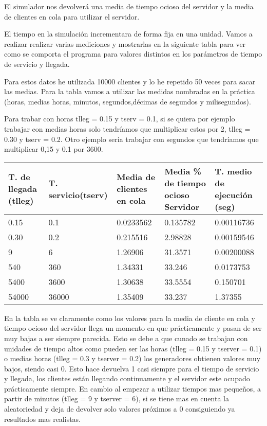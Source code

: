 \documentclass[]{article}
\begin{document}
El simulador nos devolverá una media de tiempo ocioso del servidor y la media de clientes en cola para utilizar el servidor. 
\newline

El tiempo en la simulación incrementara de forma fija en una unidad.
Vamos a realizar realizar varias mediciones y mostrarlas en la siguiente tabla para ver como se comporta el programa para valores distintos en los parámetros de tiempo de servicio y llegada. 
\newline

Para estos datos he utilizada 10000 clientes y lo he repetido 50 veces para sacar las medias.
Para la tabla vamos a utilizar las medidas nombradas en la práctica (horas, medias horas, minutos, segundos,décimas de segundos y milisegundos).
\newpage

Para trabar con horas tlleg = 0.15 y tserv = 0.1, si se quiera por ejemplo trabajar con medias horas solo tendríamos que multiplicar estos por 2, tlleg = 0.30 y tserv = 0.2. Otro ejemplo seria trabajar con segundos que tendríamos que multiplicar 0,15 y 0.1 por 3600.

\begin{table}[H]
	\begin{center}
		\begin{tabularx}{0.9\textwidth}{|X|X|X|X|X|}
			\hline
			\textbf{T. de llegada (tlleg)} & \textbf{T. servicio(tserv)}&\textbf{Media de clientes en cola} & \textbf{Media \% de tiempo ocioso Servidor} & \textbf{T. medio de ejecución (seg)} \\
			\hline \hline
			  0.15 & 0.1 & 0.0233562 & 0.135782 &0.00116736\\ \hline
			  0.30 & 0.2 & 0.215516 & 2.98828 &0.00159546 \\ \hline
			  9 & 6& 1.26906 &31.3571  &0.00200088\\ \hline
			  540 & 360 & 1.34331 & 33.246 &0.0173753\\ \hline
			  5400 & 3600 & 1.30638 & 33.5554 &0.150701\\ \hline
			  54000 & 36000 & 1.35409  & 33.237 & 1.37355 \\ \hline

		\end{tabularx}

	\end{center}
\end{table}

En la tabla se ve claramente como los valores para la media de cliente en cola y tiempo ocioso del servidor llega un momento en que prácticamente y pasan de ser muy bajas a ser siempre parecida. Esto se debe a que cunado se trabajan con unidades de tiempo altos como pueden ser las horas (tlleg = 0.15 y tserver = 0.1) o medias horas (tlleg = 0.3 y tserver = 0.2) los generadores obtienen valores muy bajos, siendo casi 0. Esto hace devuelva 1 casi siempre para el tiempo de servicio y llegada, los clientes están llegando continuamente y el servidor este ocupado prácticamente siempre. En cambio al empezar a utilizar tiempos mas pequeños, a partir de minutos (tlleg = 9 y tserver = 6), si se tiene mas en cuenta la aleatoriedad y deja de devolver solo valores próximos a 0 consiguiendo ya resultados mas realistas.
\newline
\end{document}
